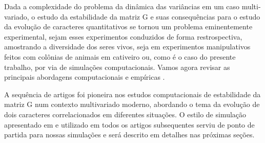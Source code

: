 \documentclass[a4paper, 12pt, titlepage, onecolumn]{article}
\numberwithin{equation}{section}
\numberwithin{table}{section}
\begin{document}
Dada a complexidade do problema da dinâmica das variâncias em um caso
multi-variado, o estudo da estabilidade da matriz G e suas consequências
para o estudo da evolução de caracteres quantitativos se tornou um
problema eminentemente experimental, sejam esses experimentos conduzidos
de forma restrospectiva, amostrando a diversidade dos seres vivos, seja
em experimentos manipulativos feitos com colônias de animais em cativeiro ou,
como é o caso do presente trabalho, por via de simulações
computacionais. Vamos agora revisar as principais abordagens computacionais e empíricas 
.

A sequência de artigos \cite{Jones2003, Jones2004, Jones2007} foi
pioneira nos estudos computacionais de estabilidade da matriz G num
contexto multivariado moderno, abordando o tema da evolução de dois
caracteres correlacionados em diferentes situações. O estilo de
simulação apresentado em \cite{Jones2003} e utilizado em todos os
artigos subsequentes serviu de ponto de partida para nossas simulações e
será descrito em detalhes nas próximas seções.
\end{document}
